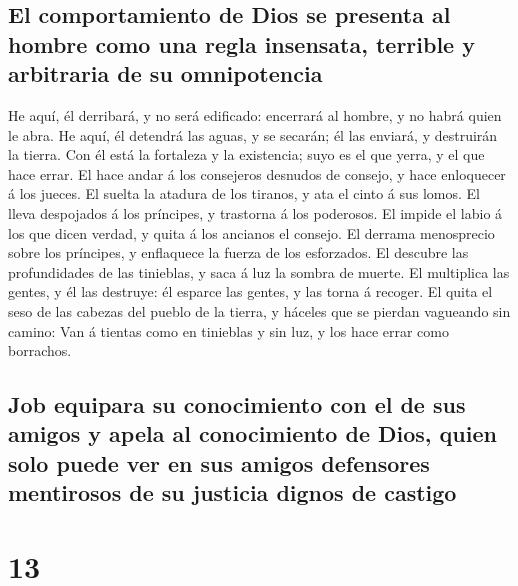 \hypertarget{el-comportamiento-de-dios-se-presenta-al-hombre-como-una-regla-insensata-terrible-y-arbitraria-de-su-omnipotencia}{%
\subsection{El comportamiento de Dios se presenta al hombre como una
regla insensata, terrible y arbitraria de su
omnipotencia}\label{el-comportamiento-de-dios-se-presenta-al-hombre-como-una-regla-insensata-terrible-y-arbitraria-de-su-omnipotencia}}

 He aquí, él derribará, y no será edificado: encerrará al
hombre, y no habrá quien le abra.  He aquí, él detendrá
las aguas, y se secarán; él las enviará, y destruirán la tierra.
 Con él está la fortaleza y la existencia; suyo es el que
yerra, y el que hace errar.  El hace andar á los
consejeros desnudos de consejo, y hace enloquecer á los jueces.
 El suelta la atadura de los tiranos, y ata el cinto á
sus lomos.  El lleva despojados á los príncipes, y
trastorna á los poderosos.  El impide el labio á los que
dicen verdad, y quita á los ancianos el consejo.  El
derrama menosprecio sobre los príncipes, y enflaquece la fuerza de los
esforzados.  El descubre las profundidades de las
tinieblas, y saca á luz la sombra de muerte.  El
multiplica las gentes, y él las destruye: él esparce las gentes, y las
torna á recoger.  El quita el seso de las cabezas del
pueblo de la tierra, y háceles que se pierdan vagueando sin camino:
 Van á tientas como en tinieblas y sin luz, y los hace
errar como borrachos.

\hypertarget{job-equipara-su-conocimiento-con-el-de-sus-amigos-y-apela-al-conocimiento-de-dios-quien-solo-puede-ver-en-sus-amigos-defensores-mentirosos-de-su-justicia-dignos-de-castigo}{%
\subsection{Job equipara su conocimiento con el de sus amigos y apela al
conocimiento de Dios, quien solo puede ver en sus amigos defensores
mentirosos de su justicia dignos de
castigo}\label{job-equipara-su-conocimiento-con-el-de-sus-amigos-y-apela-al-conocimiento-de-dios-quien-solo-puede-ver-en-sus-amigos-defensores-mentirosos-de-su-justicia-dignos-de-castigo}}

\hypertarget{section-12}{%
\section{13}\label{section-12}}

